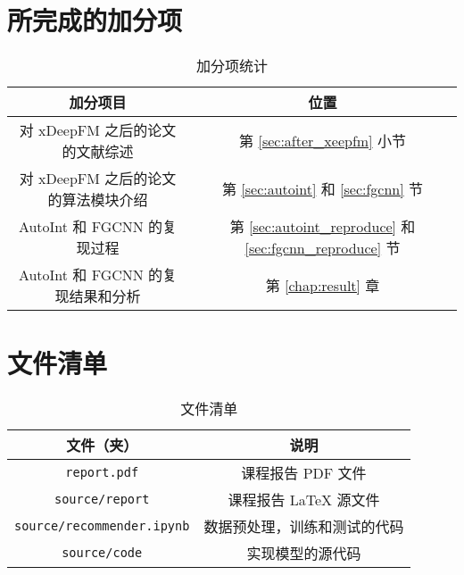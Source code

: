 \documentclass[degree=project,degree-type=project,cjk-font=noto]{thuthesis}
\begin{document}
\chapter{所完成的加分项}

\begin{table}[htb]
  \centering
  \caption{加分项统计}
  \label{tab:time_complex}
  \begin{tabular}{cc}
    \toprule
    \textbf{加分项目}         & \textbf{位置}  \\
    \midrule
    对 xDeepFM 之后的论文的文献综述 & 第 \ref{sec:after_xeepfm} 小节 \\
    对 xDeepFM 之后的论文的算法模块介绍           & 第 \ref{sec:autoint} 和 \ref{sec:fgcnn} 节 \\
    AutoInt 和 FGCNN 的复现过程        & 第 \ref{sec:autoint_reproduce} 和 \ref{sec:fgcnn_reproduce} 节 \\
    AutoInt 和 FGCNN 的复现结果和分析 & 第 \ref{chap:result} 章 \\
    \bottomrule
  \end{tabular}
\end{table}

\backmatter


\appendix

\chapter{文件清单}

\begin{table}[htb]
  \centering
  \caption{文件清单}
  \label{tab:files}
  \begin{tabular}{cc}
    \toprule
    \textbf{文件（夹）}         & \textbf{说明}  \\
    \midrule
    \texttt{report.pdf} & 课程报告 PDF 文件 \\
    \texttt{source/report}           & 课程报告 LaTeX 源文件 \\
    \texttt{source/recommender.ipynb}        & 数据预处理，训练和测试的代码 \\
    \texttt{source/code} & 实现模型的源代码 \\
    \bottomrule
  \end{tabular}
\end{table}
\end{document}
